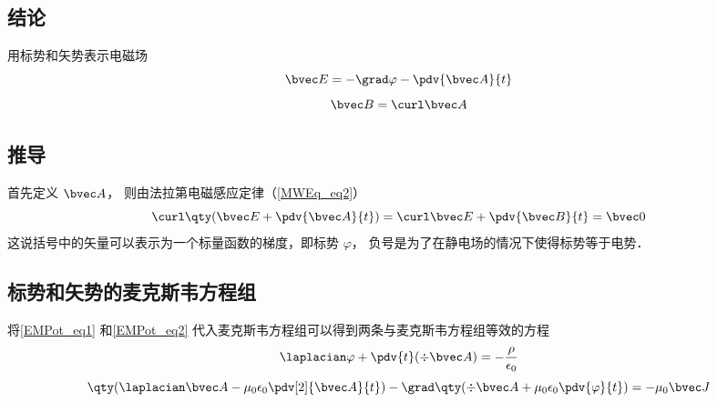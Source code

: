 

\subsection{结论}
用标势和矢势表示电磁场
\begin{equation}\label{EMPot_eq1}
\bvec E = -\grad \varphi - \pdv{\bvec A}{t}
\end{equation}
\begin{equation}\label{EMPot_eq2}
\bvec B = \curl \bvec A
\end{equation}

\subsection{推导}
首先定义 $\bvec A$， 则由法拉第电磁感应定律（\autoref{MWEq_eq2}）
\begin{equation}
\curl \qty(\bvec E + \pdv{\bvec A}{t}) = \curl \bvec E + \pdv{\bvec B}{t} = \bvec 0
\end{equation}
这说括号中的矢量可以表示为一个标量函数的梯度，即标势 $\varphi$， 负号是为了在静电场的情况下使得标势等于电势．

\subsection{标势和矢势的麦克斯韦方程组}

将\autoref{EMPot_eq1} 和\autoref{EMPot_eq2} 代入麦克斯韦方程组可以得到两条与麦克斯韦方程组等效的方程
\begin{equation}\label{EMPot_eq4}
\laplacian \varphi + \pdv{t} (\div \bvec A) = -\frac{\rho}{\epsilon_0}
\end{equation}
\begin{equation}\label{EMPot_eq5}
\qty(\laplacian \bvec A - \mu_0\epsilon_0 \pdv[2]{\bvec A}{t}) - \grad \qty(\div \bvec A + \mu_0\epsilon_0 \pdv{\varphi}{t}) = -\mu_0\bvec J
\end{equation}

